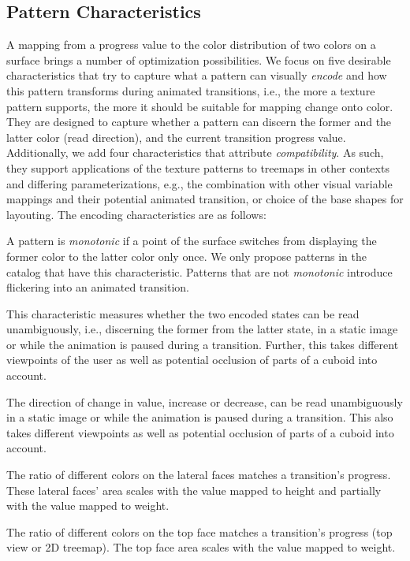 \documentclass[smallextended,natbib]{svjour3}       %
\begin{document}
\subsection{Pattern Characteristics}
A mapping from a progress value to the color distribution of two colors on a surface brings a number of optimization possibilities.
We focus on five desirable characteristics that try to capture what a pattern can visually \emph{encode} and how this pattern transforms during animated transitions, i.e., the more a texture pattern supports, the more it should be suitable for mapping change onto color.
They are designed to capture whether a pattern can discern the former and the latter color (read direction), and the current transition progress value.
Additionally, we add four characteristics that attribute \emph{compatibility}. 
As such, they support applications of the texture patterns to treemaps in other contexts and differing parameterizations, e.g., the combination with other visual variable mappings and their potential animated transition, or choice of the base shapes for layouting.
The encoding characteristics are as follows:
\newlength{\maxlabel}
\begin{description}[itemindent=0mm,labelwidth=0mm,leftmargin=\maxlabel,align=right,itemsep=1mm]
    \item [$\nabla_{\textrm{Monotonic}}$]
        A pattern is \emph{monotonic} if a point of the surface switches from displaying the former color to the latter color only once. We only propose patterns in the catalog that have this characteristic. Patterns that are not \emph{monotonic} introduce flickering into an animated transition.
    \item [$\nabla_{\textrm{DirStates}}$]
        This characteristic measures whether the two encoded states can be read unambiguously, i.e., discerning the former from the latter state, in a static image or while the animation is paused during a transition.
        Further, this takes different viewpoints of the user as well as potential occlusion of parts of a cuboid into account.
    \item [$\nabla_{\textrm{DirChange}}$]
        The direction of change in value, increase or decrease, can be read unambiguously in a static image or while the animation is paused during a transition.
        This also takes different viewpoints as well as potential occlusion of parts of a cuboid into account.
    \item [$\nabla_{\textrm{RatioLat}}$]
        The ratio of different colors on the lateral faces matches a transition's progress.
        These lateral faces' area scales with the value mapped to height and partially with the value mapped to weight.
    \item [$\nabla_{\textrm{RatioTop}}$]
        The ratio of different colors on the top face matches a transition's progress (top view or 2D treemap).
        The top face area scales with the value mapped to weight.
\end{description}
\end{document}
